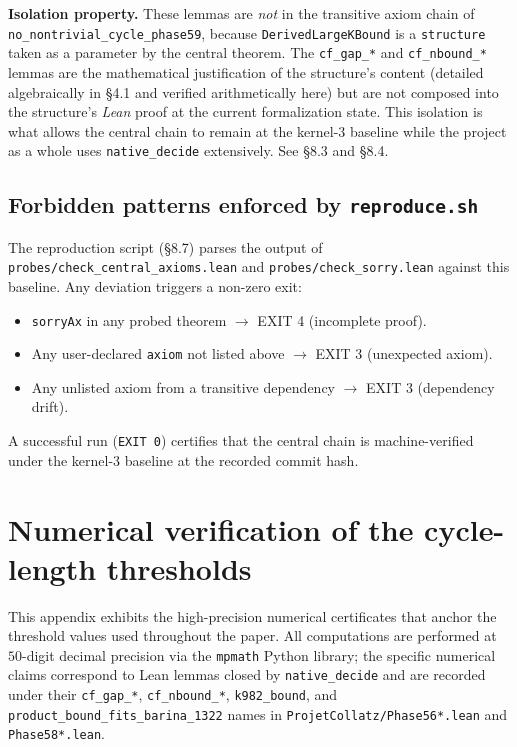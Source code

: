 \documentclass[
  11pt]{amsart}
\providecommand{\tightlist}{%
  \setlength{\itemsep}{0pt}\setlength{\parskip}{0pt}}
\theoremstyle{plain}
\theoremstyle{definition}
\theoremstyle{remark}
\begin{document}
\textbf{Isolation property.} These lemmas are \emph{not} in the
transitive axiom chain of \texttt{no\_nontrivial\_cycle\_phase59},
because \texttt{DerivedLargeKBound} is a \texttt{structure} taken as a
parameter by the central theorem. The \texttt{cf\_gap\_*} and
\texttt{cf\_nbound\_*} lemmas are the mathematical justification of the
structure's content (detailed algebraically in §4.1 and verified
arithmetically here) but are not composed into the structure's
\emph{Lean} proof at the current formalization state. This isolation is
what allows the central chain to remain at the kernel-3 baseline while
the project as a whole uses \texttt{native\_decide} extensively. See
§8.3 and §8.4.

\subsection{\texorpdfstring{Forbidden patterns enforced by
\texttt{reproduce.sh}}{Forbidden patterns enforced by reproduce.sh}}\label{forbidden-patterns-enforced-by-reproduce.sh}

The reproduction script (§8.7) parses the output of
\texttt{probes/check\_central\_axioms.lean} and
\texttt{probes/check\_sorry.lean} against this baseline. Any deviation
triggers a non-zero exit:

\begin{itemize}
\tightlist
\item
  \texttt{sorryAx} in any probed theorem \(\to\) EXIT 4 (incomplete
  proof).
\item
  Any user-declared \texttt{axiom} not listed above \(\to\) EXIT 3
  (unexpected axiom).
\item
  Any unlisted axiom from a transitive dependency \(\to\) EXIT 3
  (dependency drift).
\end{itemize}

A successful run (\texttt{EXIT\ 0}) certifies that the central chain is
machine-verified under the kernel-3 baseline at the recorded commit
hash.

\section{Numerical verification of the cycle-length
thresholds}\label{numerical-verification-of-the-cycle-length-thresholds}

This appendix exhibits the high-precision numerical certificates that
anchor the threshold values used throughout the paper. All computations
are performed at \(50\)-digit decimal precision via the \texttt{mpmath}
Python library; the specific numerical claims correspond to Lean lemmas
closed by \texttt{native\_decide} and are recorded under their
\texttt{cf\_gap\_*}, \texttt{cf\_nbound\_*}, \texttt{k982\_bound}, and
\texttt{product\_bound\_fits\_barina\_1322} names in
\texttt{ProjetCollatz/Phase56*.lean} and \texttt{Phase58*.lean}.
\end{document}
